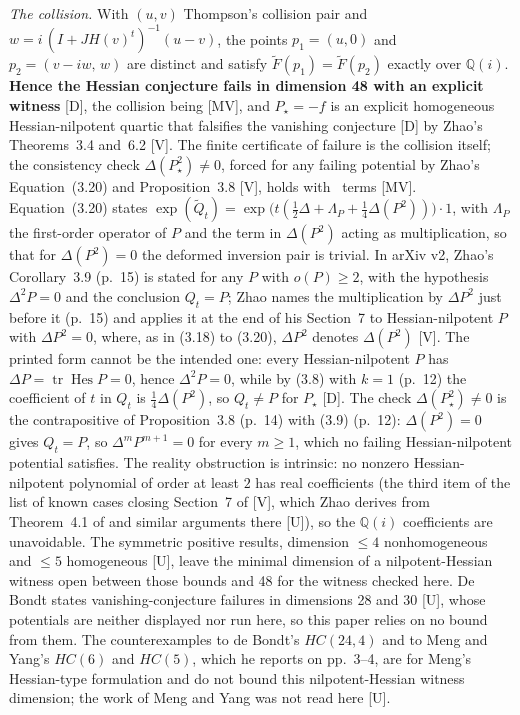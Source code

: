 \documentclass[11pt]{article}
\theoremstyle{remark}
\newcommand{\Q}{\mathbb{Q}}
\begin{document}
\emph{The collision.} With $(u, v)$ Thompson's collision pair and $w = i\,(I + JH(v)^t)^{-1}(u - v)$, the points $p_1 = (u, 0)$ and $p_2 = (v - iw,\, w)$ are distinct and satisfy $\widetilde F(p_1) = \widetilde F(p_2)$ exactly over $\Q(i)$. \textbf{Hence the Hessian conjecture fails in dimension 48 with an explicit witness} [D], the collision being [MV], and $P_\star = -f$ is an explicit homogeneous Hessian-nilpotent quartic that falsifies the vanishing conjecture [D] by Zhao's Theorems~3.4 and~6.2 \cite[pp.~12 and~25]{Zhao2004} [V]. The finite certificate of failure is the collision itself; the consistency check $\Delta(P_\star^2) \ne 0$, forced for any failing potential by Zhao's Equation~(3.20) and Proposition~3.8 \cite[pp.~14--15]{Zhao2004} [V], holds with \ndeltaterms\ terms [MV]. Equation~(3.20) states $\exp(\widetilde Q_t)=\exp\bigl(t(\tfrac12\Delta+\Lambda_P+\tfrac14\Delta(P^2))\bigr)\cdot1$, with $\Lambda_P$ the first-order operator of $P$ and the term in $\Delta(P^2)$ acting as multiplication, so that for $\Delta(P^2)=0$ the deformed inversion pair is trivial. In arXiv v2, Zhao's Corollary~3.9 (p.~15) is stated for any $P$ with $o(P)\ge2$, with the hypothesis $\Delta^2P=0$ and the conclusion $Q_t=P$; Zhao names the multiplication by $\Delta P^2$ just before it (p.~15) and applies it at the end of his Section~7 to Hessian-nilpotent $P$ with $\Delta P^2=0$, where, as in (3.18) to (3.20), $\Delta P^2$ denotes $\Delta(P^2)$ \cite[pp.~14--15 and~32]{Zhao2004} [V]. The printed form cannot be the intended one: every Hessian-nilpotent $P$ has $\Delta P=\operatorname{tr}\operatorname{Hes}P=0$, hence $\Delta^2P=0$, while by (3.8) with $k=1$ (p.~12) the coefficient of $t$ in $Q_t$ is $\tfrac14\Delta(P^2)$, so $Q_t\ne P$ for $P_\star$ [D]. The check $\Delta(P_\star^2)\ne0$ is the contrapositive of Proposition~3.8 (p.~14) with (3.9) (p.~12): $\Delta(P^2)=0$ gives $Q_t=P$, so $\Delta^mP^{m+1}=0$ for every $m\ge1$, which no failing Hessian-nilpotent potential satisfies. The reality obstruction is intrinsic: no nonzero Hessian-nilpotent polynomial of order at least $2$ has real coefficients (the third item of the list of known cases closing Section~7 of \cite[p.~32]{Zhao2004} [V], which Zhao derives from Theorem~4.1 of \cite{vdEW2004} and similar arguments there [U]), so the $\Q(i)$ coefficients are unavoidable. The symmetric positive results, dimension $\le 4$ nonhomogeneous and $\le 5$ homogeneous \cite{dBvdE2005b, vdEW2004} [U], leave the minimal dimension of a nilpotent-Hessian witness open between those bounds and 48 for the witness checked here. De Bondt states vanishing-conjecture failures in dimensions 28 and 30 \cite[abstract, p.~1]{deBondt2026} [U], whose potentials are neither displayed nor run here, so this paper relies on no bound from them. The counterexamples to de Bondt's $HC(24,4)$ and to Meng and Yang's $HC(6)$ and $HC(5)$, which he reports on pp.~3--4, are for Meng's Hessian-type formulation and do not bound this nilpotent-Hessian witness dimension; the work of Meng and Yang was not read here [U].
\end{document}
